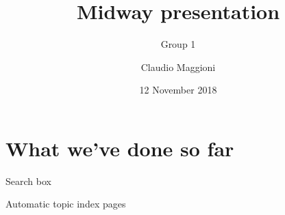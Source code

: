 \documentclass[10pt]{beamer}
\title{Midway presentation}
\subtitle{Group 1}
\date{12 November 2018}
\author{Claudio Maggioni}
\begin{document}
\maketitle

\begin{frame}[standout]
\end{frame}

\section{What we've done so far}


\begin{frame}[fragile]{Search box}
\vfill{}\vfill
\end{frame}


\begin{frame}[fragile]{Automatic topic index pages}
\vfill{}\vfill
\end{frame}
\end{document}
